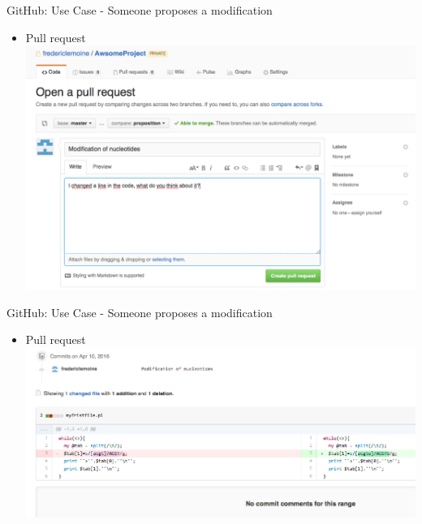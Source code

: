 \begin{frame}[fragile]{GitHub: Use Case - Someone proposes a modification}
  \begin{itemize}
  \item Pull request
    \includegraphics[width=\textwidth]{images/hosting_services_use_case_6.png}
  \end{itemize}
\end{frame}

\begin{frame}[fragile]{GitHub: Use Case - Someone proposes a modification}
  \begin{itemize}
  \item Pull request
    \includegraphics[width=\textwidth]{images/hosting_services_use_case_7.png}
  \end{itemize}
\end{frame}

